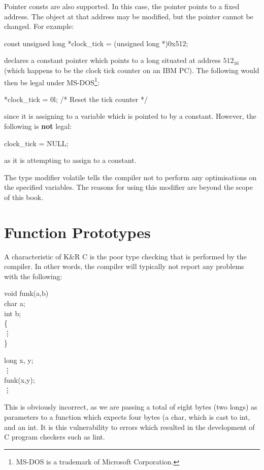 Pointer {\cd const}s are also supported. In this case, the pointer
points to a fixed address.  The object at that address may be
modified, but the pointer cannot be changed.
For example:
\begin{code}
const unsigned long *clock\_tick = (unsigned long *)0x512;
\end{code}
\noindent
 declares a constant pointer which points to a {\cd long} situated at
address $512_{16}$ (which happens to be the clock tick counter on an
IBM PC). The following would then be legal under
MS-DOS\footnote{MS-DOS is a trademark of Microsoft Corporation.}:
\begin{code}
*clock\_tick = 0l; \tab	/* Reset the tick counter */
\end{code}
\noindent
since it is assigning to a variable which is pointed to by a constant.
However, the following is {\bf not} legal:
\begin{code}
clock\_tick = NULL;
\end{code}
\noindent
as it is attempting to assign to a constant.

The type modifier {\cd volatile} tells the compiler not to perform
any optimisations on the specified variables. The reasons for using
this modifier are beyond the scope of this book.

\section{Function Prototypes}

A characteristic of K\&R C is the poor type checking that is performed
by the compiler. In other words, the compiler will typically not report
any problems with the following:
\begin{code}
void funk(a,b) \\
\> char a;		\\
\> int b;		\\
\{  				\\
 \> \vdots 		\\
\} 				\addVspace		

long x, y;    \\
\vdots		  \\
funk(x,y);	  \\
\vdots
\end{code}
\noindent
 This is obviously incorrect, as we are passing a total of eight bytes
(two {\cd long}s) as parameters to a function which expects four bytes (a
{\cd char}, which is cast to {\cd int}, and an {\cd int}. It is this
vulnerability to errors which resulted in the development of C program
checkers such as {\cmd lint}.

